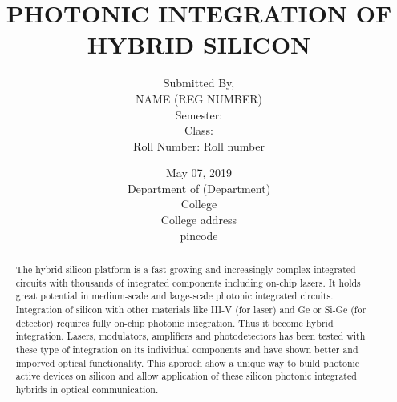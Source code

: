 \documentclass[12pt,a4paper]{report}
\begin{document}
\title{PHOTONIC INTEGRATION OF HYBRID SILICON}
\author{Submitted By,\\NAME (REG NUMBER) \\
Semester:  \\ Class:  \\ Roll Number: Roll number }       
\date{May 07, 2019\\
 Department of (Department)\\
 College\\
 College address\\
 pincode}  
\maketitle


\begin{abstract}
  The hybrid silicon platform is a fast growing and increasingly complex integrated circuits with thousands of integrated components including on-chip lasers. It holds great potential in medium-scale and large-scale photonic integrated circuits. Integration of silicon with other materials like III-V (for laser) and Ge or Si-Ge (for detector) requires fully on-chip photonic integration. Thus it become hybrid integration. Lasers, modulators, amplifiers and photodetectors has been tested with these type of integration on its individual components and have shown better and imporved optical functionality. This approch show a unique way to build photonic active devices on silicon and allow application of these silicon photonic integrated hybrids in optical communication.
\end{abstract}

\tableofcontents
\end{document}
